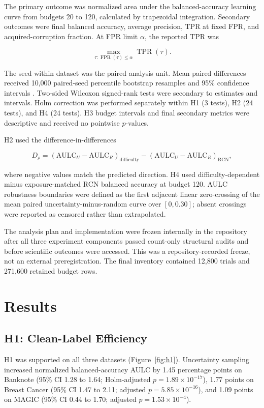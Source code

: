 \documentclass[11pt]{article}
\begin{document}
The primary outcome was normalized area under the balanced-accuracy learning
curve from budgets 20 to 120, calculated by trapezoidal integration. Secondary
outcomes were final balanced accuracy, average precision, TPR at fixed FPR,
and acquired-corruption fraction. At FPR limit $\alpha$, the reported TPR was

\[
\max_{\tau:\operatorname{FPR}(\tau)\leq\alpha}
\operatorname{TPR}(\tau).
\]

The seed within dataset was the paired analysis unit. Mean paired differences
received 10,000 paired-seed percentile bootstrap resamples and 95\%
confidence intervals \citep{efron1979}. Two-sided Wilcoxon signed-rank tests
\citep{wilcoxon1945} were secondary to estimates and intervals. Holm
correction \citep{holm1979} was performed separately within H1 (3 tests), H2
(24 tests), and H4 (24 tests). H3 budget intervals and final secondary metrics
were descriptive and received no pointwise $p$-values.

H2 used the difference-in-differences

\[
D_\rho=
\left(\mathrm{AULC}_{U}-\mathrm{AULC}_{R}\right)_{\mathrm{difficulty}}
-
\left(\mathrm{AULC}_{U}-\mathrm{AULC}_{R}\right)_{\mathrm{RCN}},
\]

where negative values match the predicted direction. H4 used
difficulty-dependent minus exposure-matched RCN balanced accuracy at budget
120.
AULC robustness boundaries were defined as the first adjacent linear
zero-crossing of the mean paired uncertainty-minus-random curve over
$[0,0.30]$; absent crossings were reported as censored rather than
extrapolated.

The analysis plan and implementation were frozen internally in the repository
after all three experiment components passed count-only structural audits and
before scientific outcomes were accessed. This was a repository-recorded
freeze, not an external preregistration. The final inventory contained 12,800
trials and 271,600 retained budget rows.

\section{Results}

\subsection{H1: Clean-Label Efficiency}

H1 was supported on all three datasets (Figure~\ref{fig:h1}). Uncertainty
sampling increased normalized balanced-accuracy AULC by 1.45 percentage points
on Banknote (95\% CI 1.28 to 1.64; Holm-adjusted
$p=1.89\times10^{-17}$), 1.77 points on Breast Cancer (95\% CI 1.47 to
2.11; adjusted $p=5.85\times10^{-16}$), and 1.09 points on MAGIC (95\%
CI 0.44 to 1.70; adjusted $p=1.53\times10^{-4}$).
\end{document}

